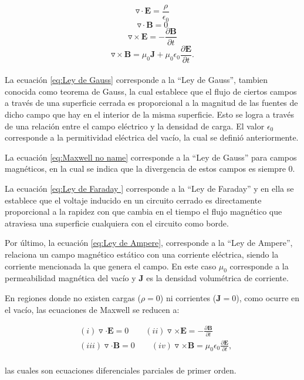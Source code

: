 \documentclass[12pt,letterpaper]{article}
\numberwithin{equation}{section}
\begin{document}
\begin{equation}
\triangledown\cdot\textbf{E} = \frac{\rho}{\epsilon_0}
\label{eq:Ley de Gauss}
\end{equation}
\begin{equation}
\triangledown\cdot\textbf{B} = 0
\label{eq:Maxwell no name}
\end{equation}
\begin{equation}
\triangledown\times\textbf{E} = -\frac{\partial\textbf{B}}{\partial t}
\label{eq:Ley de Faraday }
\end{equation}
\begin{equation}
\triangledown\times\textbf{B} = \mu_0 \textbf{J} + \mu_0\epsilon_0\frac{\partial\textbf{E}}{\partial t}.
\label{eq:Ley de Ampere}
\end{equation}
\\

La ecuación \ref{eq:Ley de Gauss} corresponde a la ``Ley de Gauss'', tambien conocida como teorema de Gauss, la cual establece que el flujo de ciertos campos a través de una superficie cerrada es proporcional a la magnitud de las fuentes de dicho campo que hay en el interior de la misma superficie. Esto se logra a través de una relación entre el campo eléctrico y la densidad de carga. El valor $\epsilon_0$ corresponde a la permitividad eléctrica del vacío, la cual se definió anteriormente.

La ecuación \ref{eq:Maxwell no name} corresponde a la ``Ley de Gauss'' para campos magnéticos, en la cual se indica que la divergencia de estos campos es siempre 0.

La ecuación \ref{eq:Ley de Faraday } corresponde a la ``Ley de Faraday'' y en ella se establece que el voltaje inducido en un circuito cerrado es directamente proporcional a la rapidez con que cambia en el tiempo el flujo magnético que atraviesa una superficie cualquiera con el circuito como borde.

Por último, la ecuación \ref{eq:Ley de Ampere}, corresponde a la ``Ley de Ampere'', relaciona un campo magnético estático con una corriente eléctrica, siendo la corriente mencionada la que genera el campo. En este caso $\mu_{0}$ corresponde a la permeabilidad magnética del vacío y \textbf{J} es la densidad volumétrica de corriente.

En regiones donde no existen cargas ($\rho = 0$) ni corrientes ($\textbf{J} = 0$), como ocurre en el vacío, las ecuaciones de Maxwell se reducen a:

\begin{equation}
\begin{split}
&(i)\triangledown\cdot\textbf{E} = 0\qquad(ii)\triangledown\times\textbf{E} = -\frac{\partial\textbf{B}}{\partial t}\\
&(iii)\triangledown\cdot\textbf{B} = 0\qquad(iv)\triangledown\times\textbf{B} = \mu_0\epsilon_0\frac{\partial\textbf{E}}{\partial t},
\end{split}
\label{eq: Maxwell_sin_cargas}
\end{equation}
\\
\noindent las cuales son ecuaciones diferenciales parciales de primer orden.
 
\end{document}
